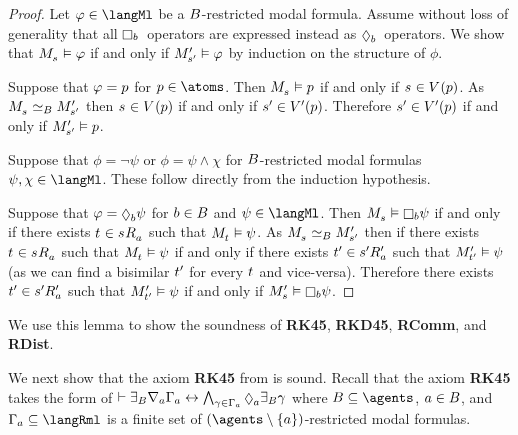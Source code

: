 \begin{proof}
Let $\phi \in \langMl$ be a $B$-restricted modal formula.
Assume without loss of generality that all $\necessaryB$~operators are expressed instead as $\possibleB$~operators.
We show that $\kPModel{\kStateS} \entails \phi$ if and only if ${M^{\prime}_{{s}^{\prime}}} \vDash \varphi$ by induction on the structure of $\phi$.

Suppose that $\varphi = p$ for $\atomP \in \atoms$.
Then $\kPModel{\kStateS} \entails \atomP$ if and only if $\kStateS \in \kValuation(\atomP)$.
As $\kPModel{\kStateS} \bisimilar[\agentsB] \kPModelP{\kStateSP}$ then $\kStateS \in \kValuation(\atomP)$ if and only if ${s}^{\prime} \in {V^{\prime}}(p)$.
Therefore ${s}^{\prime} \in {V^{\prime}}(p)$ if and only if ${M^{\prime}_{{s}^{\prime}}} \vDash p$.

Suppose that $\phi = \lnot \psi$ or $\phi = \psi \land \chi$ for $B$-restricted modal formulas $\psi, \chi \in \langMl$.
These follow directly from the induction hypothesis.

Suppose that $\phi = \possible[\agentB] \psi$ for $b \in B$ and $\psi \in \langMl$.
Then $\kPModel{\kStateS} \entails \necessary[\agentB] \psi$ if and only if there exists $\kStateT \in \kSuccessorsA{\kStateS}$ such that $\kPModel{\kStateT} \entails \psi$.
As $\kPModel{\kStateS} \bisimilar[\agentsB] \kPModelP{\kStateSP}$ then if there exists $\kStateT \in \kSuccessorsA{\kStateS}$ such that $\kPModel{\kStateT} \entails \psi$ if and only if there exists ${t}^{\prime} \in {{s}^{\prime}} {R^{\prime}_{a}}$ such that ${M^{\prime}_{{t}^{\prime}}} \vDash \psi$ (as we can find a bisimilar ${t}^{\prime}$ for every $\kStateT$ and vice-versa).
Therefore there exists ${t}^{\prime} \in {{s}^{\prime}} {R^{\prime}_{a}}$ such that ${M^{\prime}_{{t}^{\prime}}} \vDash \psi$ if and only if $\kPModelP{\kStateS} \entails \necessary[\agentB] \psi$.
\end{proof}

We use this lemma to show the soundness of {\bf RK45}, {\bf RKD45}, {\bf RComm}, and {\bf RDist}.

We next show that the axiom {\bf RK45} from \axiomRmlKFF{} is sound.
Recall that the axiom {\bf RK45} takes the form of $\proves \somerefsBs \coversA \Gamma_\agentA \iff \bigwedge_{\gamma \in \Gamma_\agentA} \possibleA \somerefsBs \gamma$ where $\agentsB \subseteq \agents$, $a \in B$, and $\Gamma_\agentA \subseteq \langRml$ is a finite set of $(\agents \setminus \{\agentA\})$-restricted modal formulas.

